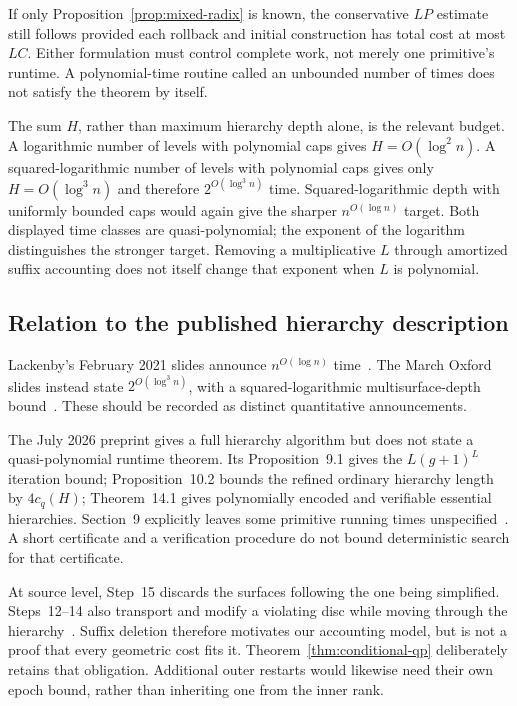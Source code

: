 If only Proposition~\ref{prop:mixed-radix} is known, the conservative $LP$
estimate still follows provided each rollback and initial construction has
total cost at most $LC$.  Either formulation must control complete work,
not merely one primitive's runtime.  A polynomial-time routine called an
unbounded number of times does not satisfy the theorem by itself.

The sum $H$, rather than maximum hierarchy depth alone, is the relevant
budget.  A logarithmic number of levels with polynomial caps gives
$H=O(\log^2 n)$.  A squared-logarithmic number of levels with polynomial
caps gives only $H=O(\log^3 n)$ and therefore
$2^{O(\log^3 n)}$ time.  Squared-logarithmic depth with uniformly bounded
caps would again give the sharper $n^{O(\log n)}$ target.  Both displayed
time classes are quasi-polynomial; the exponent of the logarithm distinguishes
the stronger target.  Removing a multiplicative $L$ through amortized suffix
accounting does not itself change that exponent when $L$ is polynomial.

\subsection{Relation to the published hierarchy description}

Lackenby's February 2021 slides announce $n^{O(\log n)}$
time~\cite{lackenbyfeb}.  The March Oxford slides instead state
$2^{O(\log^3 n)}$, with a squared-logarithmic multisurface-depth
bound~\cite{lackenbymarch}.  These should be recorded as distinct quantitative
announcements.

The July 2026 preprint gives a full hierarchy algorithm but does not state a
quasi-polynomial runtime theorem.  Its Proposition~9.1 gives the
$L(g+1)^L$ iteration bound; Proposition~10.2 bounds the refined ordinary
hierarchy length by $4c_q(H)$; Theorem~14.1 gives polynomially encoded and
verifiable essential hierarchies.  Section~9 explicitly leaves some primitive
running times unspecified~\cite{lackenby2026}.  A short certificate and a
verification procedure do not bound deterministic search for that certificate.

At source level, Step~15 discards the surfaces following the one being
simplified.  Steps~12--14 also transport and modify a violating disc while
moving through the hierarchy~\cite{lackenby2026}.  Suffix deletion therefore
motivates our accounting model, but is not a proof that every geometric cost
fits it.  Theorem~\ref{thm:conditional-qp} deliberately retains that
obligation.  Additional outer restarts would likewise need their own epoch
bound, rather than inheriting one from the inner rank.

